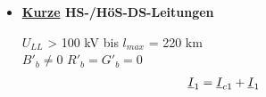 \begin{itemize}
\item[] \textbf{\ul{Kurze} HS-/HöS-DS-Leitungen}

    $U_{LL}$ > 100 kV bis $l_{max}$ = 220 km\\
    $B'_b \neq 0 $ \qquad $R'_b = G'_b = 0$
    \begin{gather*}
        \underline{I}_1 = \underline{I}_{c1} + \underline{I}_1 \qquad
    \end{gather*}



\end{itemize}
